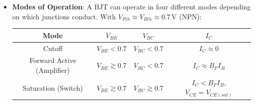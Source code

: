 \begin{itemize}
\begin{itemize}
\begin{itemize}
\begin{align*}
              V_{BE} &= V_T \ln \left( \frac{I_C}{I_{S}} + 1 \right) \\
              V_{BC} &< V_{Rth}
            \end{align*}
          \item \textbf{Under Reverse Active Mode} (\(e^{V_{BE}/V_T} \approx 0\)):
            The emitter now collects. From \(I_E = I_F - A_R I_R\) with \(I_F \approx -I_{FS}\):
            \begin{align*}
              I_E &\approx -A_R I_{RS} \left( e^{\frac{V_{BC}}{V_T}} - 1 \right) = -I_S \left( e^{\frac{V_{BC}}{V_T}} - 1 \right) \\
              V_{BC} &= V_T \ln \left( \frac{-I_E}{I_{S}} + 1 \right) \\
              V_{BE} &< V_{Fth}
            \end{align*}
          \end{itemize}
      \item \textbf{Collector-Emitter \(V_{CE}\) Voltage}:
        The collector-emitter voltage is the voltage across the collector and
        emitter terminals. It is given by:
        \begin{align*}
          V_{CE} &= V_{BE} - V_{BC} \\
          V_{CE} &= V_B - V_E - (V_B - V_C) \\
          V_{CE} &= V_B - V_E - V_B + V_C \\
          V_{CE} &= V_C - V_E
        \end{align*}
    \end{itemize}
  \item \textbf{Modes of Operation}:
    A BJT can operate in four different modes depending on which junctions
    conduct. With \(V_{Fth} \approx V_{Rth} \approx 0.7\,\)V (NPN):
    \begin{table}[H]
      \centering
      \begin{tabular}{|c|c|c|c|}\hline
        \textbf{Mode}              & \( V_{BE} \)        & \( V_{BC} \)             & \(I_{C}\) \\ \hline
        Cutoff                     & $V_{BE} < 0.7       $ & $V_{BC} < 0.7 $       & $I_C \approx 0$ \\ \hline
        Forward Active (Amplifier) & $V_{BE} \gtrsim 0.7 $ & $V_{BC} < 0.7 $       & $I_C \approx B_F I_B$ \\ \hline
        Saturation (Switch)        & $V_{BE} \gtrsim 0.7 $ & $V_{BC} \gtrsim 0.7 $ & $I_C < B_F I_B$, \(V_{CE} = V_{CE(sat)}\) \\ \hline

\end{tabular}
\end{table}
\end{itemize}
